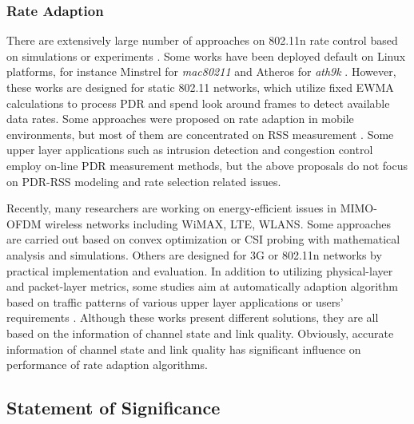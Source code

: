 \documentclass[draftclsnofoot,journal,onecolumn,11pt]{IEEEtran}
\begin{document}
\subsubsection{Rate Adaption}
There are extensively large number of approaches on 802.11n rate control based on simulations or experiments \cite{kim2009experimental} \cite{Pefkianakis:2010} \cite{zhang2008practical}. Some works have been deployed default on Linux platforms, for instance Minstrel \cite{minstrel} for \textit{mac80211} and Atheros for \textit{ath9k} \cite{wong2008wireless}. However, these works are designed for static 802.11 networks, which utilize fixed EWMA calculations to process PDR and spend look around frames to detect available data rates. Some approaches were proposed on rate adaption in mobile environments, but most of them are concentrated on RSS measurement \cite{chen2011ram} \cite{judd2008efficient}. Some upper layer applications such as intrusion detection \cite{5620919} and congestion control \cite{floyd2000equation} employ on-line PDR measurement methods, but the above proposals do not focus on PDR-RSS modeling and rate selection related issues.

Recently, many researchers are working on energy-efficient issues in MIMO-OFDM wireless networks including WiMAX, LTE, WLANS. Some approaches are carried out based on convex optimization \cite{5510775} or CSI probing \cite{6214414} with mathematical analysis and simulations. Others are designed for 3G \cite{Peng:2011:TPS:2030613.2030628} or 802.11n \cite{Li:2012:ERA:2348543.2348585} \cite{Zhang:2011:EEI:2030613.2030637} networks by practical implementation and evaluation. In addition to utilizing physical-layer and packet-layer metrics, some studies aim at automatically adaption algorithm based on traffic patterns of various upper layer applications \cite{Han:2012:DPW:2307636.2307675} \cite{Jang:2011:SEM:2079296.2079308} or users' requirements \cite{Zhuang:2010:IEE:1814433.1814464} \cite{Schulman:2010:BPA:1859995.1860006}. Although these works present different solutions, they are all based on the information of channel state and link quality. Obviously, accurate information of channel state and link quality has significant influence on performance of rate adaption algorithms.

\subsection{Statement of Significance}
\end{document}
